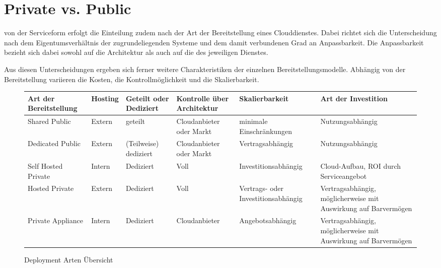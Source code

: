 \section{Private vs. Public}
\label{sec_privacy_models}

 von der Serviceform erfolgt die Einteilung zudem nach der Art der Bereitstellung eines Clouddienstes. Dabei richtet sich die Unterscheidung nach dem Eigentumsverhältnis der zugrundeliegenden Systeme und dem damit verbundenen Grad an Anpassbarkeit. Die Anpassbarkeit bezieht sich dabei sowohl auf die Architektur als auch auf die des jeweiligen Dienstes. 

Aus diesen Unterscheidungen ergeben sich ferner weitere Charakteristiken der einzelnen Bereitstellungsmodelle. Abhängig von der Bereitstellung variieren die Kosten, die Kontrollmöglichkeit und die Skalierbarkeit.

\begin{figure}
	\centering
	\caption{Deployment Arten Übersicht}
	\label{deploymentTypesTable}
	\begin{tabular}{|>{\RaggedRight}p{3cm}|>{\RaggedRight}p{1.6cm}|>{\RaggedRight}p{2.2cm}|>{\RaggedRight}p{2.5cm}|>{\RaggedRight}p{2.7cm}|>{\RaggedRight}p{3cm}|}
		\hline
		\rule[-2ex]{0pt}{5.5ex} \textbf{Art der \newline  Bereitstellung} & \textbf{Hosting} & \textbf{Geteilt oder Dediziert} & \textbf{Kontrolle über Architektur} & \textbf{Skalierbarkeit} & \textbf{Art der Investition} \\ 
		\hline
		\rule[-2ex]{0pt}{5.5ex} Shared Public & Extern & geteilt & Cloudanbieter oder Markt & minimale Einschränkungen & Nutzungsabhängig \\ 
		\hline
		\rule[-2ex]{0pt}{5.5ex} Dedicated Public & Extern & (Teilweise) dediziert & Cloudanbieter oder Markt & Vertragsabhängig & Nutzungsabhängig \\ 
		\hline
		\rule[-2ex]{0pt}{5.5ex} Self Hosted Private & Intern & Dediziert & Voll & Investitionsabhängig & Cloud-Aufbau, ROI durch Serviceangebot \\ 
		\hline
		\rule[-2ex]{0pt}{5.5ex} Hosted Private & Extern & Dediziert & Voll & Vertrags- oder Investitionsabhängig & Vertragsabhängig, möglicherweise mit Auswirkung auf Barvermögen \\ 
		\hline \rule[-2ex]{0pt}{5.5ex} Private Appliance & Intern & Dediziert & Cloudanbieter & Angebotsabhängig & Vertragsabhängig, möglicherweise mit Auswirkung auf Barvermögen \\ 
		\hline 
	\end{tabular}
\end{figure}

